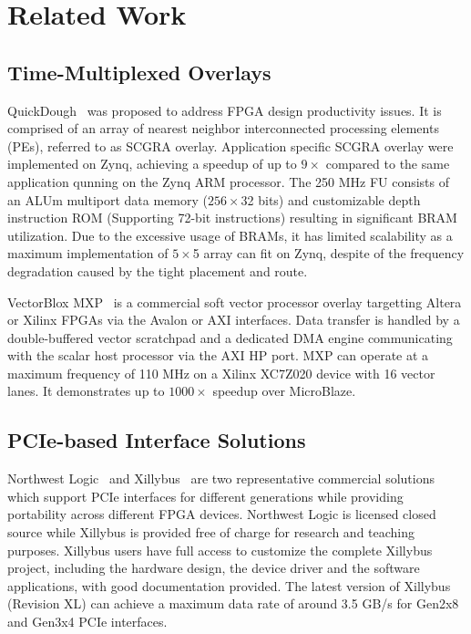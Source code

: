 \section{Related Work}


\subsection{Time-Multiplexed Overlays}

QuickDough~\cite{liu2015quickdough} was proposed to address FPGA design productivity issues. 
It is comprised of an array of nearest neighbor interconnected processing elements (PEs), referred to as SCGRA overlay.  
Application specific SCGRA overlay were implemented on Zynq, achieving a speedup of up to $9\times$ compared to the same application qunning on the Zynq ARM processor. 
The 250 MHz FU consists of an ALUm multiport data memory ($256\times$32 bits) and customizable depth instruction ROM (Supporting 72-bit instructions) resulting in significant BRAM utilization. 
Due to the excessive usage of BRAMs, it has limited scalability as a maximum implementation of $5\times$5 array can fit on Zynq, despite of the frequency degradation caused by the tight placement and route. 


VectorBlox MXP~\cite{severance2013embedded} is a commercial soft vector processor overlay targetting Altera or Xilinx FPGAs via the Avalon or AXI interfaces. 
Data transfer is handled by a double-buffered vector scratchpad and a dedicated DMA engine communicating with the scalar host processor via the AXI HP port.
MXP can operate at a maximum frequency of 110 MHz on a Xilinx XC7Z020 device with 16 vector lanes. 
It demonstrates up to $1000\times$ speedup over MicroBlaze. 


\subsection{PCIe-based Interface Solutions} 
Northwest Logic~\cite{nwlogic2018} and Xillybus~\cite{xillybus2018} are two representative commercial solutions which support PCIe interfaces for different generations while providing portability across different FPGA devices. 
Northwest Logic is licensed closed source while Xillybus is provided free of charge for research and teaching purposes. 
Xillybus users have full access to customize the complete Xillybus project, including the hardware design, the device driver and the software applications, with good documentation provided.
The latest version of Xillybus (Revision XL) can achieve a maximum data rate of around 3.5 GB/s for Gen2x8 and Gen3x4 PCIe interfaces.

